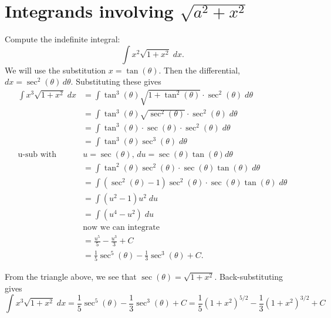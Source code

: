 \documentclass{ximera}
\begin{document}
\section{Integrands involving $\sqrt{a^2 + x^2}$}

\begin{example}
Compute the indefinite integral:
\[
\int x^2\sqrt{1+x^2} \; dx.
\]
We will use the substitution $x = \tan(\theta)$.  Then the differential, 
$dx = \sec^2(\theta) \, d\theta$.  Substituting these gives
\begin{align*}
\int x^3\sqrt{1+x^2} \; dx &= \int \tan^3(\theta) \sqrt{1+\tan^2(\theta)} \cdot \sec^2(\theta) \; d\theta\\
                           &= \int \tan^3(\theta) \sqrt{\sec^2(\theta)} \cdot \sec^2(\theta) \; d\theta\\
                           &= \int \tan^3(\theta) \cdot \sec(\theta) \cdot \sec^2(\theta) \; d\theta\\
                           &= \int \tan^3(\theta) \sec^3(\theta) \; d\theta\\
                           \text{u-sub with } \; & u=\sec(\theta), \, du = \sec(\theta) \tan(\theta) d\theta\\
                           &= \int \tan^2(\theta) \sec^2(\theta) \cdot \sec(\theta) \tan(\theta)\; d\theta\\
                           &= \int \left(\sec^2(\theta)-1 \right) \sec^2(\theta) \cdot \sec(\theta) \tan(\theta)\; d\theta\\ 
                           &= \int (u^2 -1)u^2 \; du\\ 
                           &= \int (u^4 -u^2) \; du\\
                           &\text{now we can integrate}\\
                           &= \frac{u^5}{5} - \frac{u^3}{3} + C\\
                           &= \frac15 \sec^5(\theta)  - \frac13 \sec^3(\theta) + C.
\end{align*}


From the triangle above, we see that $\sec(\theta)= \sqrt{1+x^2}$.  Back-substituting gives
\[
\int x^3\sqrt{1+x^2} \; dx = \frac15 \sec^5(\theta)  - \frac13 \sec^3(\theta) + C = \frac15 (1+x^2)^{5/2}  - \frac13 (1+x^2)^{3/2} + C
\]

\end{example}
\end{document}
